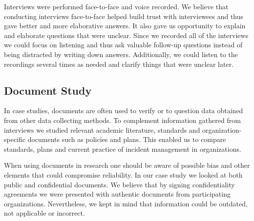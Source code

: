 Interviews were performed face-to-face and voice recorded. We believe that conducting interviews face-to-face helped build trust with interviewees and thus gave better and more elaborative answers. It also gave us opportunity to explain and elaborate questions that were unclear. Since we recorded all of the interviews we could focus on listening and thus ask valuable follow-up questions instead of being distracted by writing down answers. Additionally, we could listen to the recordings several times as needed and clarify things that were unclear later.



\subsection{Document Study}
\label{sec:documentStudy}
In case studies, documents are often used to verify or to question data obtained from other data collecting methods. To complement information gathered from interviews we studied relevant academic literature, standards and organization-specific documents such as policies and plans. This enabled us to compare standards, plans and current practice of incident management in organizations.

When using documents in research one should be aware of possible bias and other elements that could compromise reliability\cite{oates2005researching}. In our case study we looked at both public and confidential documents.  We believe that by signing confidentiality agreements we were presented with authentic documents from participating organizations. Nevertheless, we kept in mind that information could be outdated, not applicable or incorrect.      

